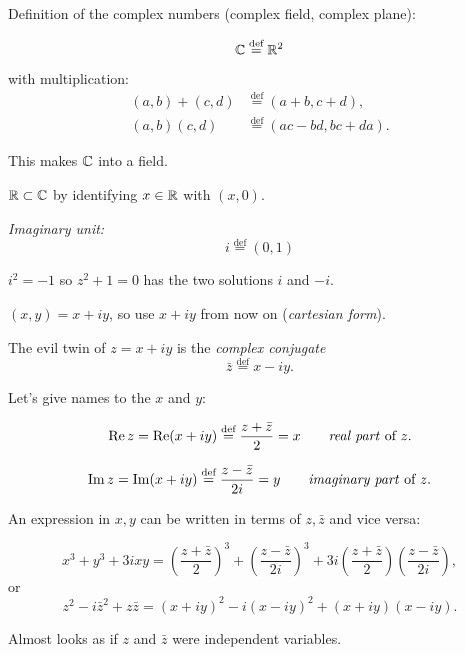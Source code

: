 \documentclass[10pt,aspectratio=169]{beamer}
\begin{document}
\begin{frame}
Definition of the complex numbers (complex field, complex plane):

\[
\C \overset{\text{def}}{=} \R^2
\]

with multiplication:
\begin{align*}
(a,b) + (c,d) & \overset{\text{def}}{=} (a+b,c+d) , \\
(a,b) (c,d) & \overset{\text{def}}{=} (ac-bd,bc+da) .
\end{align*}

\pause

This makes $\C$ into a field.

\pause
\medskip

$\R \subset \C$ by identifying $x \in \R$ with $(x,0)$.

\pause
\medskip

\emph{Imaginary unit:}
\[
i \overset{\text{def}}{=} (0,1)
\]

\pause
\medskip

$
i^2 = -1
$
\qquad so
$z^2+1=0$ has the two solutions $i$ and $-i$.
\end{frame}

\begin{frame}

$(x,y) = x+iy$, so use $x+iy$ from now on (\emph{cartesian form}).

\medskip
\pause

The evil twin of $z=x+iy$ is the \emph{complex conjugate}
\[
\bar{z} \overset{\text{def}}{=} x-iy.
\]

\medskip
\pause

Let's give names to the $x$ and $y$:

\[
\Re z = 
\Re (x+iy)
\overset{\text{def}}{=}
\frac{z+\bar{z}}{2}
= x
\qquad \text{\emph{real part} of } z .
\]

\pause

\[
\Im z = 
\Im (x+iy)
\overset{\text{def}}{=}
\frac{z-\bar{z}}{2i}
= y
\qquad \text{\emph{imaginary part} of } z .
\]

\pause

An expression in $x,y$ can be written in terms of $z,\bar{z}$
and vice versa:

\[
x^3 + y^3 + 3ixy
=
{\left( \frac{z+ \bar{z}}{2} \right)}^3 + 
{\left( \frac{z- \bar{z}}{2i} \right)}^3 + 
3i {\left( \frac{z+ \bar{z}}{2} \right)} 
{\left( \frac{z- \bar{z}}{2i} \right)} ,
\]
or
\[
z^2 - i \bar{z}^2 + z \bar{z}
=
{(x+iy)}^2 - i {(x-iy)}^2 + 
(x+iy)(x-iy) .
\]
\pause

Almost looks as if $z$ and $\bar{z}$ were independent variables.
\end{frame}
\end{document}
